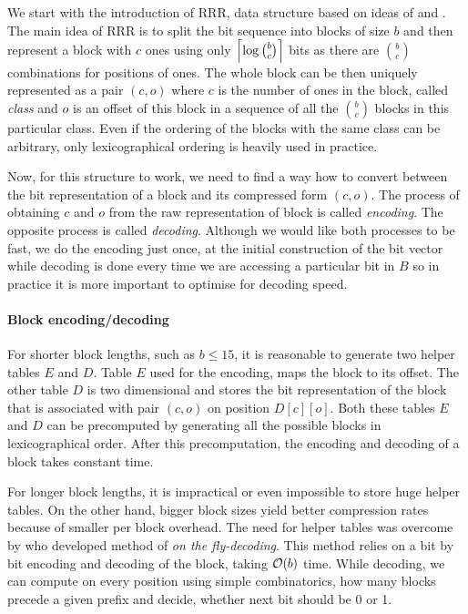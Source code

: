 We start with the introduction of RRR, data structure based on ideas of \cite{pagh2001low} and
\cite{raman2007succinct}. The main idea of RRR is to split the bit sequence into blocks of size
$b$ and then represent a block with $c$ ones using only $\left\lceil \log {b \choose c} \right\rceil$ bits as
there are ${b \choose c}$ combinations for positions of ones. The whole block can be then uniquely
represented as a pair $(c, o)$ where $c$ is the number of ones in the block, called \emph{class} and
$o$ is an offset of this block in a sequence of all the ${b \choose c}$ blocks in this particular class.
Even if the ordering of the blocks with the same class can be arbitrary, only lexicographical ordering
is heavily used in practice.

Now, for this structure to work, we need to find a way how to convert between the bit representation of
a block and its compressed form $(c, o)$. The process of obtaining $c$ and $o$ from the raw representation
of block is called \textit{encoding}. The opposite process is called \textit{decoding}. Although
we would like both processes to be fast, we do the encoding just once, at the initial construction
of the bit vector while decoding is done every time we are accessing a particular bit in $B$ so in practice
it is more important to optimise for decoding speed.

\paragraph{Block encoding/decoding}

For shorter block lengths, such as $b\leq 15$, it is reasonable to generate two helper tables $E$ and $D$.
Table $E$ used for the encoding, maps the block to its offset. The other table $D$ is two dimensional and
stores the bit representation of the block that is associated with pair $(c, o)$ on position $D[c][o]$.
Both these tables $E$ and $D$ can be precomputed by generating all the possible blocks in lexicographical
order. After this precomputation, the encoding and decoding of a block takes constant time.

For longer block lengths, it is impractical or even impossible to store huge helper tables. On the other
hand, bigger block sizes yield better compression rates because of smaller per block overhead. The need for
helper tables was overcome by \cite{navarro2012fast} who developed method of \textit{on the fly-decoding}.
This method relies on a bit by bit encoding and decoding of the block, taking $\mathcal{O}(b)$ time. While decoding,
we can compute on every position using simple combinatorics, how many blocks precede a given prefix and decide,
whether next bit should be 0 or 1.

